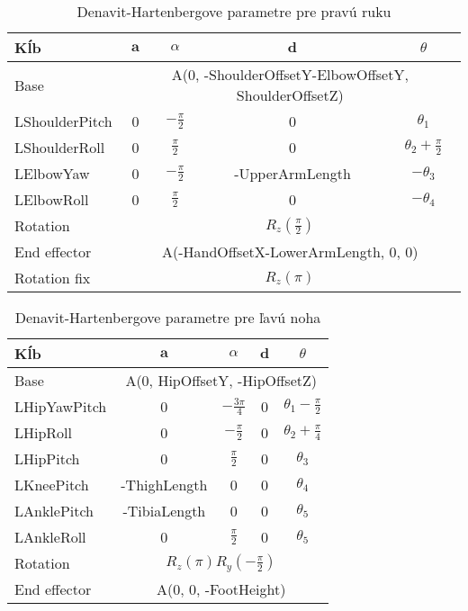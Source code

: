 \begin{table}[H]
	\centering
	\caption{Denavit-Hartenbergove parametre pre pravú ruku}
	\begin{tabular}{|l|c|c|c|c|}
	\hline
	\textbf{Kĺb} & $\textbf{a}$ & $\mathbb{\alpha}$ & $\textbf{d}$ & $\theta$ \\
	\hline
	Base & \multicolumn{4}{|c|}{A(0, -ShoulderOffsetY-ElbowOffsetY, ShoulderOffsetZ)} \\
	\hline
	LShoulderPitch & 0 & $-\frac{\pi}{2}$ & 0 & $\theta_1$ \\
	\hline
	LShoulderRoll & 0 & $\frac{\pi}{2}$ & 0 & $\theta_2 + \frac{\pi}{2}$ \\
	\hline
	LElbowYaw & 0 & $-\frac{\pi}{2}$ & -UpperArmLength & $-\theta_3$ \\
	\hline
	LElbowRoll & 0 & $\frac{\pi}{2}$ & 0 & $-\theta_4$ \\
	\hline
	Rotation & \multicolumn{4}{|c|}{$R_z\left(\frac{\pi}{2}\right)$} \\
	\hline
	End effector & \multicolumn{4}{|c|}{A(-HandOffsetX-LowerArmLength, 0, 0)} \\
	\hline
	Rotation fix & \multicolumn{4}{|c|}{$R_z\left(\pi\right)$} \\
	\hline
	\end{tabular}
\end{table}


\begin{table}[H]
	\centering
	\caption{Denavit-Hartenbergove parametre pre ľavú noha}
	\begin{tabular}{|l|c|c|c|c|}
	\hline
	\textbf{Kĺb} & $\textbf{a}$ & $\mathbb{\alpha}$ & $\textbf{d}$ & $\theta$ \\
	\hline
	Base & \multicolumn{4}{|c|}{A(0, HipOffsetY, -HipOffsetZ)} \\
	\hline
	LHipYawPitch & 0 & $-\frac{3\pi}{4}$ & 0 & $\theta_1 - \frac{\pi}{2}$ \\
	\hline
	LHipRoll & 0 & $-\frac{\pi}{2}$ & 0 &  $\theta_2 + \frac{\pi}{4}$ \\
	\hline
	LHipPitch & 0 & $\frac{\pi}{2}$ & 0 & $\theta_3$ \\
	\hline
	LKneePitch & -ThighLength & 0 & 0 & $\theta_4$ \\
	\hline 
	LAnklePitch & -TibiaLength & 0 & 0 & $\theta_5$ \\
	\hline
	LAnkleRoll & 0 & $\frac{\pi}{2}$ & 0 & $\theta_5$ \\
	\hline
	Rotation & \multicolumn{4}{|c|}{$R_z\left(\pi\right)R_y\left(-\frac{\pi}{2}\right)$} \\
	\hline
	End effector & \multicolumn{4}{|c|}{A(0, 0, -FootHeight)} \\
	\hline
	\end{tabular}
\end{table}


